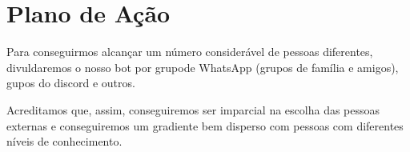 \section{Plano de Ação}
    Para conseguirmos alcançar um número considerável de pessoas diferentes, divuldaremos o nosso bot por grupode WhatsApp (grupos de família e amigos), gupos do discord e outros.\par
    Acreditamos que, assim, conseguiremos ser imparcial na escolha das pessoas externas e conseguiremos um gradiente bem disperso com pessoas com diferentes níveis de conhecimento.
    